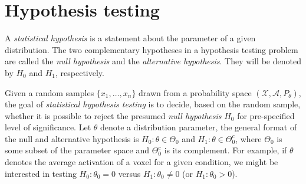 \clearpage

\vspace*{\fill}
\minitoc
\vspace*{\fill}
\newpage


\section{Hypothesis testing}

A \emph{statistical hypothesis} is a statement about the parameter of a given distribution. The two complementary hypotheses in a hypothesis testing problem are called the \emph{null hypothesis} and the \emph{alternative hypothesis}. They will be denoted by $H_0$ and $H_1$, respectively. 


Given a random samples $\{x_1, \ldots, x_n\}$ drawn from a probability space $(\mathcal{X}, \mathcal{A}, P_{\theta})$, the goal of \emph{statistical hypothesis testing} is to decide, based on the random sample, whether it is possible to reject the presumed \emph{null hypothesis} $H_0$ for pre-specified level of significance. Let $\theta$ denote a distribution parameter, the general format of the null and alternative hypothesis is $H_0: \theta \in \Theta_0$ and $H_1: \theta \in \Theta_0^c$, where $\Theta_0$ is some subset of the parameter space and $\Theta_0^c$ is its complement. For example, if $\theta$ denotes the average activation of a voxel for a given condition, we might be interested in testing $H_0: \theta_0 = 0$ versus $H_1: \theta_0 \neq 0$ (or $H_1: \theta_0 > 0$).



